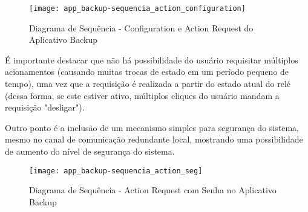 \begin{figure}[H]
	\centering
	\caption{Diagrama de Sequência - Configuration e Action Request do Aplicativo Backup}
	\texttt{[image: app\_backup-sequencia\_action\_configuration]}
	\label{fig:app_backup-sequencia_action_configuration}
\end{figure}

É importante destacar que não há possibilidade do usuário requisitar múltiplos acionamentos (causando muitas trocas de estado em um período pequeno de tempo), uma vez que a requisição é realizada a partir do estado atual do relé (dessa forma, se este estiver ativo, múltiplos cliques do usuário mandam a requisição "desligar").

Outro ponto é a inclusão de um mecanismo simples para segurança do sistema, mesmo no canal de comunicação redundante local, mostrando uma possibilidade de aumento do nível de segurança do sistema.

\begin{figure}[H]
	\centering
	\caption{Diagrama de Sequência - Action Request com Senha no Aplicativo Backup}
	\texttt{[image: app\_backup-sequencia\_action\_seg]}
	\label{fig:app_backup-sequencia_action_seg}
\end{figure}
